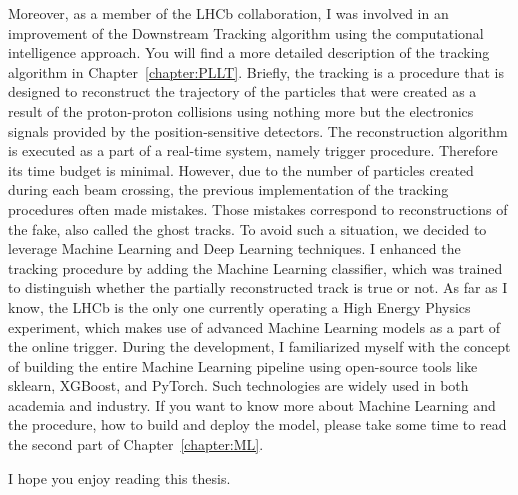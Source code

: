 Moreover, as a member of the LHCb collaboration, I was involved in an improvement of the Downstream Tracking algorithm using the computational intelligence approach. You will find a more detailed description of the tracking algorithm in Chapter~\ref{chapter:PLLT}. Briefly, the tracking is a procedure that is designed to reconstruct the trajectory of the particles that were created as a result of the proton-proton collisions using nothing more but the electronics signals provided by the position-sensitive detectors. The reconstruction algorithm is executed as a part of a real-time system, namely trigger procedure. Therefore its time budget is minimal. However, due to the number of particles created during each beam crossing, the previous implementation of the tracking procedures often made mistakes. Those mistakes correspond to reconstructions of the fake, also called the ghost tracks. To avoid such a situation, we decided to leverage Machine Learning and Deep Learning techniques. I enhanced the tracking procedure by adding the Machine Learning classifier, which was trained to distinguish whether the partially reconstructed track is true or not. As far as I know, the LHCb is the only one currently operating a High Energy Physics experiment, which makes use of advanced Machine Learning models as a part of the online trigger. During the development, I familiarized myself with the concept of building the entire Machine Learning pipeline using open-source tools like sklearn, XGBoost, and PyTorch. Such technologies are widely used in both academia and industry. If you want to know more about Machine Learning and the procedure, how to build and deploy the model, please take some time to read the second part of Chapter~\ref{chapter:ML}. 


I hope you enjoy reading this thesis. 

